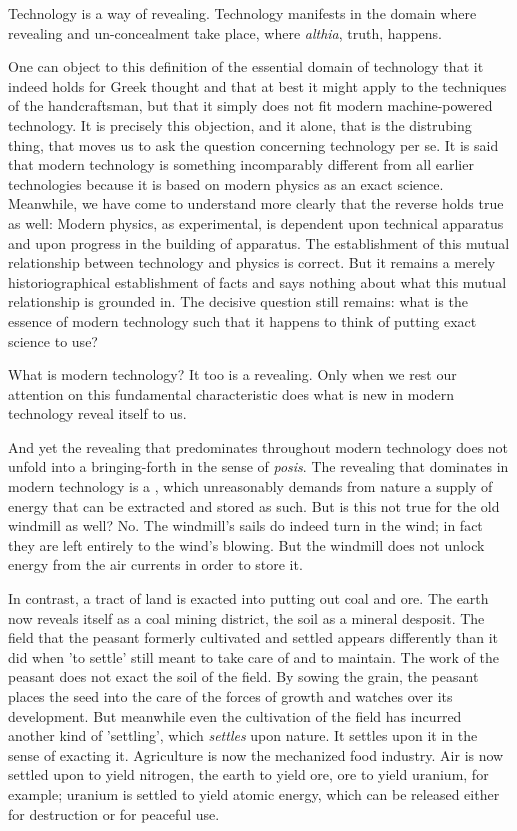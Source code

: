 \documentclass[12pt]{article}
\begin{document}
Technology is a way of revealing. Technology manifests in the domain where revealing and un-concealment take place, where \textit{althia}, truth, happens.

One can object to this definition of the essential domain of technology that it indeed holds for Greek thought and that at best it might apply to the techniques of the handcraftsman, but that it simply does not fit modern machine-powered technology. It is precisely this objection, and it alone, that is the distrubing thing, that moves us to ask the question concerning technology per se. It is said that modern technology is something incomparably different from all earlier technologies because it is based on modern physics as an exact science. Meanwhile, we have come to understand more clearly that the reverse holds true as well: Modern physics, as experimental, is dependent upon technical apparatus and upon progress in the building of apparatus. The establishment of this mutual relationship between technology and physics is correct. But it remains a merely historiographical establishment of facts and says nothing about what this mutual relationship is grounded in. The decisive question still remains: what is the essence of modern technology such that it happens to think of putting exact science to use?

What is modern technology? It too is a revealing. Only when we rest our attention on this fundamental characteristic does what is new in modern technology reveal itself to us. 

And yet the revealing that predominates throughout modern technology does not unfold into a bringing-forth in the sense of \textit{posis}. The revealing that dominates in modern technology is a , which unreasonably demands from nature a supply of energy that can be extracted and stored as such. But is this not true for the old windmill as well? No. The windmill's sails do indeed turn in the wind; in fact they are left entirely to the wind's blowing. But the windmill does not unlock energy from the air currents in order to store it.

In contrast, a tract of land is exacted into putting out coal and ore. The earth now reveals itself as a coal mining district, the soil as a mineral desposit. The field that the peasant formerly cultivated and settled appears differently than it did when 'to settle' still meant to take care of and to maintain. The work of the peasant does not exact the soil of the field. By sowing the grain, the peasant places the seed into the care of the forces of growth and watches over its development. But meanwhile even the cultivation of the field has incurred another kind of 'settling', which \textit{settles} upon nature. It settles upon it in the sense of exacting it. Agriculture is now the mechanized food industry. Air is now settled upon to yield nitrogen, the earth to yield ore, ore to yield uranium, for example; uranium is settled to yield atomic energy, which can be released either for destruction or for peaceful use.
\end{document}
